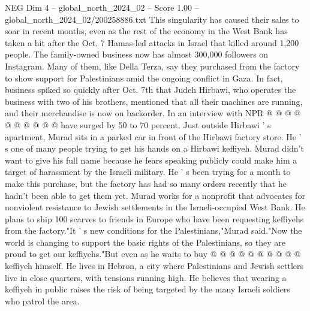 \begin{textsample}{NEG Dim 4 – global\_north\_2024\_02 – Score 1.00 – global\_north\_2024\_02/200258886.txt}
This singularity has caused their sales to soar in recent months, even as the rest of the economy in the West Bank has taken a hit after the Oct. 7 Hamas-led attacks in Israel that killed around 1,200 people.
The family-owned business now has almost 300,000 followers on Instagram.
Many of them, like Della Terza, say they purchased from the factory to show support for Palestinians amid the ongoing conflict in Gaza.
In fact, business spiked so quickly after Oct. 7th that Judeh Hirbawi, who operates the business with two of his brothers, mentioned that all their machines are running, and their merchandise is now on backorder.
In an interview with NPR @ @ @ @ @ @ @ @ @ @ have surged by 50 to 70 percent.
Just outside Hirbawi ' s apartment, Murad sits in a parked car in front of the Hirbawi factory store.
He ' s one of many people trying to get his hands on a Hirbawi keffiyeh.
Murad didn't want to give his full name because he fears speaking publicly could make him a target of harassment by the Israeli military.
He ' s been trying for a month to make this purchase, but the factory has had so many orders recently that he hadn't been able to get them yet.
Murad works for a nonprofit that advocates for nonviolent resistance to Jewish settlements in the Israeli-occupied West Bank.
He plans to ship 100 scarves to friends in Europe who have been requesting keffiyehs from the factory."It ' s new conditions for the Palestinians,"Murad said."Now the world is changing to support the basic rights of the Palestinians, so they are proud to get our keffiyehs."But even as he waits to buy @ @ @ @ @ @ @ @ @ @ keffiyeh himself.
He lives in Hebron, a city where Palestinians and Jewish settlers live in close quarters, with tensions running high.
He believes that wearing a keffiyeh in public raises the risk of being targeted by the many Israeli soldiers who patrol the area.

\end{textsample}
